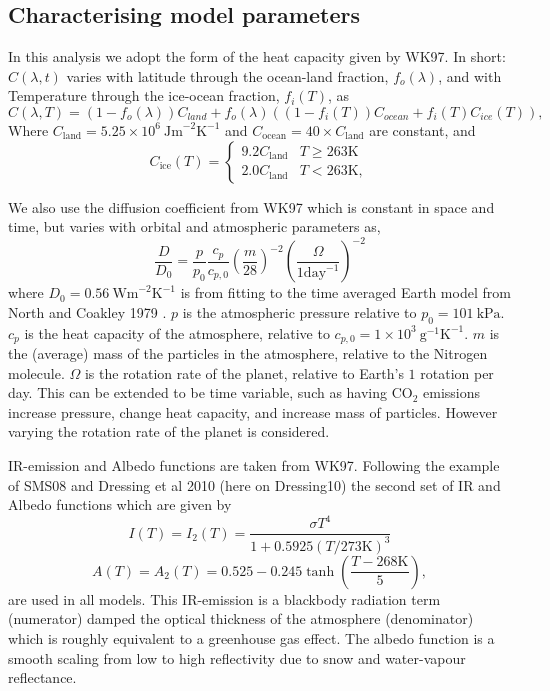 \documentclass[12pt, onecolumn]{revtex4-2}    %
\newcommand{\heatcap}{\ensuremath{\ \text{Jm}^{-2} \text{K}^{-1}}}
\newcommand{\diffusion}{\ensuremath{\ \text{Wm}^{-2} \text{K}^{-1}}}
\begin{document}
\subsection{Characterising model parameters} \label{ssec:model_params}

In this analysis we adopt the form of the heat capacity given by WK97.
In short: $C(\lambda, t)$ varies with latitude through the ocean-land fraction, $f_o(\lambda)$, and with Temperature through the ice-ocean fraction, $f_i(T)$, as
$$
    C(\lambda, T) = (1 - f_o(\lambda)) C_{land} + f_o(\lambda) ((1-f_i(T)) C_{ocean} + f_i(T) C_{ice}(T)),
$$
Where $C_{\text{land}} = 5.25\times10^6 \heatcap$ and $C_{\text{ocean}} = 40 \times C_{\text{land}}$ are constant, and
$$
    C_{\text{ice}}(T) =
    \begin{cases}
        9.2 C_\text{land} & T \ge 263\text{K} \\
        2.0 C_\text{land} & T < 263\text{K},
    \end{cases}
$$

We also use the diffusion coefficient from WK97 which is constant in space and time, but varies with orbital and atmospheric parameters as,
$$
    \frac{D}{D_0} = \frac{p}{p_0} \frac{c_p}{c_{p,0}} \left(\frac{m}{28}\right)^{-2} \left(\frac{\Omega}{1 \text{day}^{-1}}\right)^{-2}
$$
where $D_0 = 0.56 \diffusion$ is from fitting to the time averaged Earth model from North and Coakley 1979 \cite{NC79}.
$p$ is the atmospheric pressure relative to $p_0 = 101 \ \text{kPa}$.
$c_p$ is the heat capacity of the atmosphere, relative to $c_{p,0} = 1\times10^3 \ \text{g}^{-1} \text{K}^{-1}$.
$m$ is the (average) mass of the particles in the atmosphere, relative to the Nitrogen molecule.
$\Omega$ is the rotation rate of the planet, relative to Earth's $1$ rotation per day.
This can be extended to be time variable, such as having CO$_2$ emissions increase pressure, change heat capacity, and increase mass of particles.
However varying the rotation rate of the planet is considered.

IR-emission and Albedo functions are taken from WK97. Following the example of SMS08 and Dressing et al 2010 (here on Dressing10) \cite{Dressing10} the second set of IR and Albedo functions which are given by
$$
    I(T) = I_2(T) = \frac{\sigma T^4}{1 + 0.5925 (T / 273 \text{K}) ^ 3}
$$
$$
    A(T) = A_2(T) = 0.525 - 0.245 \tanh\left(\frac{T - 268 \text{K}}{5}\right),
$$
are used in all models.
This IR-emission is a blackbody radiation term (numerator) damped the optical thickness of the atmosphere (denominator) which is roughly equivalent to a greenhouse gas effect.
The albedo function is a smooth scaling from low to high reflectivity due to snow and water-vapour reflectance.
\end{document}
